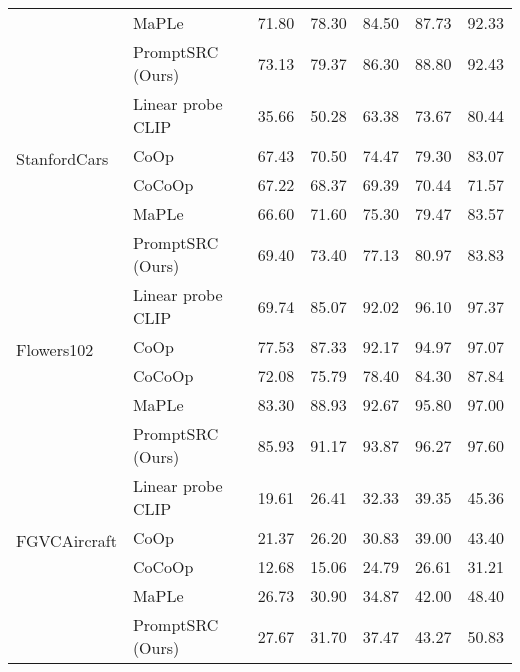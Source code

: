\documentclass[10pt,twocolumn,letterpaper]{article}
\begin{document}
\begin{center}
\begin{table*}[t!]
{\begin{tabular}{ll|ccccc}
                                                              & MaPLe                  & 71.80	&78.30	&84.50&	87.73&	92.33\\
                              \rowcolor{tabhighlight}   & PromptSRC (Ours)             &73.13 &79.37	&86.30	&88.80	&92.43\\
\midrule
\multirow{4}{*}{StanfordCars}  & Linear probe CLIP     & 35.66	&50.28	&63.38	&73.67	&80.44\\
                           & CoOp                        &67.43	&70.50	&74.47	&79.30	&83.07\\
                                   & CoCoOp              & 67.22	&68.37	&69.39	&70.44&	71.57\\
                                                                  & MaPLe                  & 66.60	&71.60	&75.30&	79.47&	83.57\\
                              \rowcolor{tabhighlight}  &  PromptSRC (Ours)              &69.40	&73.40	&77.13	&80.97	&83.83\\
\midrule
\multirow{4}{*}{Flowers102}    & Linear probe CLIP      & 69.74	&85.07	&92.02	&96.10	&97.37\\
                               & CoOp                   & 77.53	&87.33	&92.17	&94.97	&97.07\\
                               & CoCoOp                    &72.08	&75.79	&78.40	&84.30	&87.84\\
                                                              & MaPLe                  & 83.30	&88.93	&92.67&	95.80&	97.00\\
                                \rowcolor{tabhighlight}  & PromptSRC (Ours)           & 85.93	&91.17	&93.87	&96.27	&97.60\\
                               \midrule
\multirow{4}{*}{FGVCAircraft}  & Linear probe CLIP       & 19.61	&26.41	&32.33	&39.35&	45.36\\
                               & CoOp                     & 21.37&	26.20	&30.83	&39.00	&43.40\\
                               & CoCoOp                   & 12.68	&15.06	&24.79	&26.61	&31.21\\
                                                              & MaPLe                  & 26.73	&30.90	& 34.87&	42.00&	48.40\\
                              \rowcolor{tabhighlight}   & PromptSRC (Ours)          & 27.67	&31.70	&37.47&	43.27	&50.83\\


\end{tabular}}
\end{table*}
\end{center}
\end{document}
